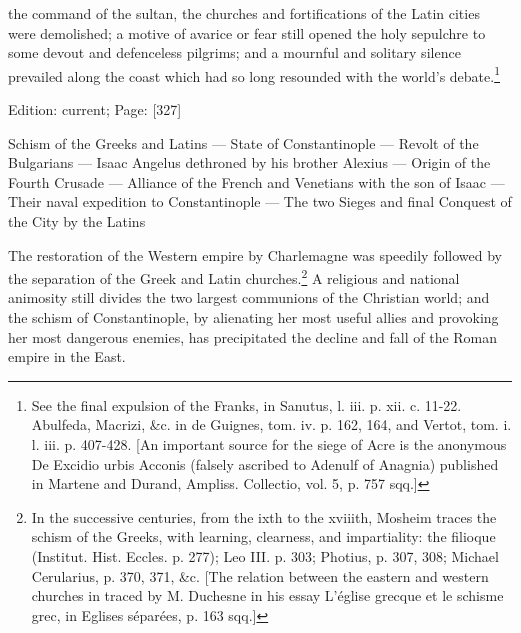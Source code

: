 the command of the sultan, the churches and fortifications of the Latin cities were demolished; a motive of avarice or fear still opened the holy sepulchre to some devout and defenceless pilgrims; and a mournful and solitary silence prevailed along the coast which had so long resounded with the world\texthebrew{}’s debate.\footnote{See the final expulsion of the Franks, in Sanutus, l. iii. p. xii. c. 11-22. Abulfeda, Macrizi, \&c. in de Guignes, tom. iv. p. 162, 164, and Vertot, tom. i. l. iii. p. 407-428. [An important source for the siege of Acre is the anonymous De Excidio urbis Acconis (falsely ascribed to Adenulf of Anagnia) published in Martene and Durand, Ampliss. Collectio, vol. 5, p. 757 sqq.]}

Edition: current; Page: [327]


Schism of the Greeks and Latins \texthebrew{—} State of Constantinople \texthebrew{—} Revolt of the Bulgarians \texthebrew{—} Isaac Angelus dethroned by his brother Alexius \texthebrew{—} Origin of the Fourth Crusade \texthebrew{—} Alliance of the French and Venetians with the son of Isaac \texthebrew{—} Their naval expedition to Constantinople \texthebrew{—} The two Sieges and final Conquest of the City by the Latins

The restoration of the Western empire by Charlemagne was speedily followed by the separation of the Greek and Latin churches.\footnote{In the successive centuries, from the ixth to the xviiith, Mosheim traces the schism of the Greeks, with learning, clearness, and impartiality: the filioque (Institut. Hist. Eccles. p. 277); Leo III. p. 303; Photius, p. 307, 308; Michael Cerularius, p. 370, 371, \&c. [The relation between the eastern and western churches in traced by M. Duchesne in his essay L\texthebrew{}’église grecque et le schisme grec, in Eglises séparées, p. 163 sqq.]} A religious and national animosity still divides the two largest communions of the Christian world; and the schism of Constantinople, by alienating her most useful allies and provoking her most dangerous enemies, has precipitated the decline and fall of the Roman empire in the East.

